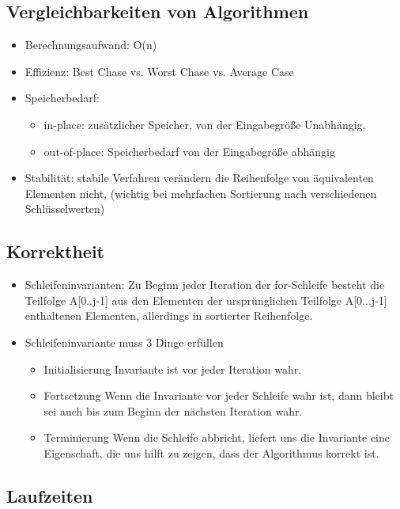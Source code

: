 \documentclass[jou,apacite]{apa6}
\begin{document}
\subsection{Vergleichbarkeiten von Algorithmen}
\begin{itemize}
    \item Berechnungsaufwand: O(n)
    \item Effizienz: Best Chase vs. Worst Chase vs. Average Case
    \item Speicherbedarf: \begin{itemize}
        \item in-place: zusätzlicher Speicher, von der Eingabegröße Unabhängig,
        \item out-of-place: Speicherbedarf von der Eingabegröße abhängig
    \end{itemize}
    \item Stabilität: stabile Verfahren verändern die Reihenfolge von äquivalenten Elementen nicht, (wichtig bei mehrfachen Sortierung nach verschiedenen Schlüsselwerten)
\end{itemize}

\subsection{Korrektheit}
\begin{itemize}
    \item Schleifeninvarianten: Zu Beginn jeder Iteration der for-Schleife besteht die Teilfolge A[0..j-1] aus den Elementen der ursprünglichen Teilfolge A[0...j-1] enthaltenen Elementen, allerdings in sortierter Reihenfolge.
    \item Schleifeninvariante muss 3 Dinge erfüllen
    \begin{itemize}
        \item Initialisierung Invariante ist vor jeder Iteration wahr.
        \item Fortsetzung Wenn die Invariante vor jeder Schleife wahr ist, dann bleibt sei auch bis zum Beginn der nächsten Iteration wahr.
        \item Terminierung Wenn die Schleife abbricht, liefert uns die Invariante eine Eigenschaft, die uns hilft zu zeigen, dass der Algorithmus korrekt ist. 
    \end{itemize}
\end{itemize}

\subsection{Laufzeiten}
\end{document}
